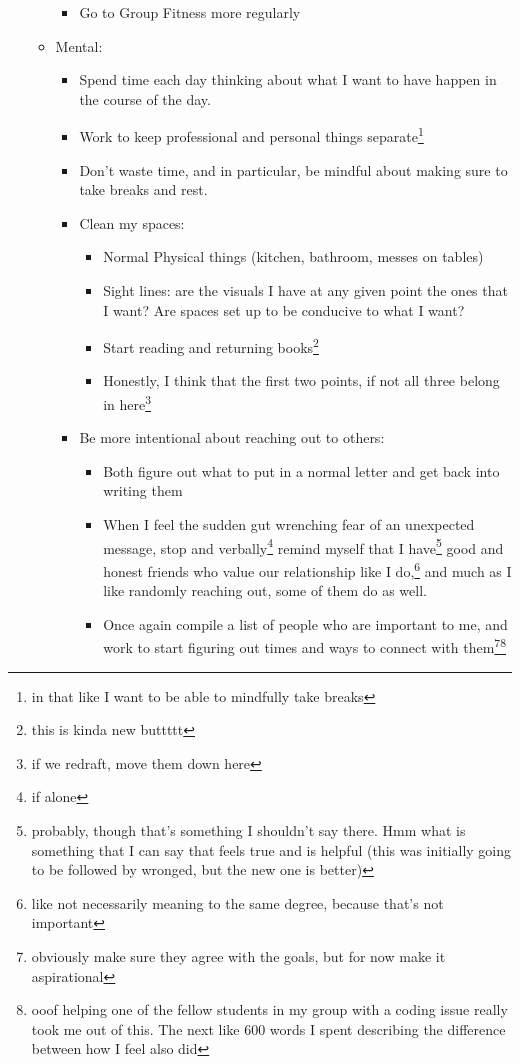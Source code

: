 \documentclass[12pt]{article}[titlepage]
\renewcommand{\,}{\textsuperscript{,}}
\begin{document}
\begin{itemize}
\begin{itemize}
\begin{itemize}
\item Go to Group Fitness more regularly  
\end{itemize}  
\item Mental:  
\begin{itemize}  
\item Spend time each day thinking about what I want to have happen in the course of the day.  
\item Work to keep professional and personal things separate\footnote{in that like I want to be able to mindfully take breaks}  
\item Don't waste time, and in particular, be mindful about making sure to take breaks and rest.  
\item Clean my spaces:  
\begin{itemize}  
\item Normal Physical things (kitchen, bathroom, messes on tables)  
\item Sight lines: are the visuals I have at any given point the ones that I want? Are spaces set up to be conducive to what I want?  
\item Start reading and returning books\footnote{this is kinda new buttttt}  
\item Honestly, I think that the first two points, if not all three belong in here\footnote{if we redraft, move them down here}  
\end{itemize}  
\item Be more intentional about reaching out to others:  
\begin{itemize}  
\item Both figure out what to put in a normal letter and get back into writing them  
\item When I feel the sudden gut wrenching fear of an unexpected message, stop and verbally\footnote{if alone} remind myself that I have\footnote{probably, though that's something I shouldn't say there. Hmm what is something that I can say that feels true and is helpful (this was initially going to be followed by wronged, but the new one is better)} good and honest friends who value our relationship like I do,\footnote{like not necessarily meaning to the same degree, because that's not important} and much as I like randomly reaching out, some of them do as well.  
\item Once again compile a list of people who are important to me, and work to start figuring out times and ways to connect with them\footnote{obviously make sure they agree with the goals, but for now make it aspirational}\footnote{ooof helping one of the fellow students in my group with a coding issue really took me out of this. The next like 600 words I spent describing the difference between how I feel also did}  

\end{itemize}
\end{itemize}
\end{itemize}
\end{itemize}
\end{document}
